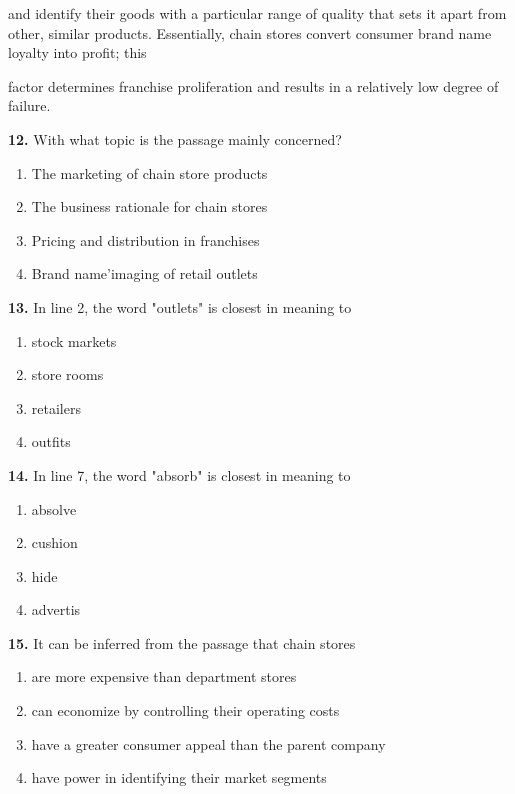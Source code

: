 \documentclass[12pt]{article}
\begin{document}
and identify their goods with a particular range of quality that sets it apart from other, similar products. Essentially, chain stores convert consumer brand name loyalty into profit; this\par
factor determines franchise proliferation and results in a relatively low degree of failure.\par
\endgroup
\medskip
\noindent\textbf{12.} With what topic is the passage mainly concerned?
\begin{enumerate}[label=(\Alph*),leftmargin=*,itemsep=0.2em]
\item The marketing of chain store products
\item The business rationale for chain stores
\item Pricing and distribution in franchises
\item Brand name'imaging of retail outlets
\end{enumerate}
\par
\vspace{0.25\baselineskip}
\noindent\textbf{13.} In line 2, the word "outlets" is closest in meaning to
\begin{enumerate}[label=(\Alph*),leftmargin=*,itemsep=0.2em]
\item stock markets
\item store rooms
\item retailers
\item outfits
\end{enumerate}
\par
\vspace{0.25\baselineskip}
\noindent\textbf{14.} In line 7, the word "absorb" is closest in meaning to
\begin{enumerate}[label=(\Alph*),leftmargin=*,itemsep=0.2em]
\item absolve
\item cushion
\item hide
\item advertis
\end{enumerate}
\par
\vspace{0.25\baselineskip}
\noindent\textbf{15.} It can be inferred from the passage that chain stores
\begin{enumerate}[label=(\Alph*),leftmargin=*,itemsep=0.2em]
\item are more expensive than department stores
\item can economize by controlling their operating costs
\item have a greater consumer appeal than the parent company
\item have power in identifying their market segments
\end{enumerate}
\end{document}
